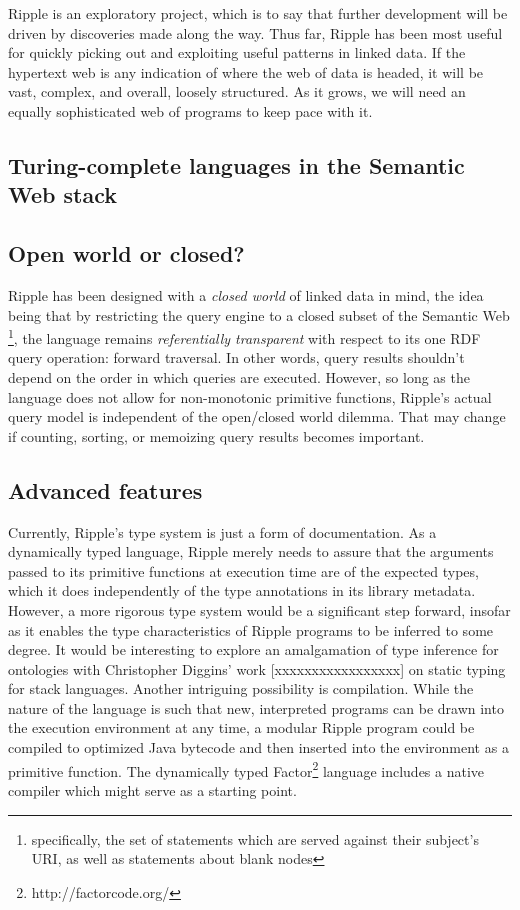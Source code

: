 \documentclass[runningheads]{llncs}
\begin{document}
Ripple is an exploratory project, which is to say that further development will be driven by discoveries made along the way.  Thus far, Ripple has been most useful for quickly picking out and exploiting useful patterns in linked data.  If the hypertext web is any indication of where the web of data is headed, it will be vast, complex, and overall, loosely structured.  As it grows, we will need an equally sophisticated web of programs to keep pace with it.

\subsection{Turing-complete languages in the Semantic Web stack}


\subsection{Open world or closed?}

Ripple has been designed with a \textit{closed world} of linked data in mind, the idea being that by restricting the query engine to a closed subset of the Semantic Web \footnote{specifically, the set of statements which are served against their subject's URI, as well as statements about blank nodes}, the language remains \textit{referentially transparent} with respect to its one RDF query operation: forward traversal.  In other words, query results shouldn't depend on the order in which queries are executed.  However, so long as the language does not allow for non-monotonic primitive functions, Ripple's actual query model is independent of the open/closed world dilemma.  That may change if counting, sorting, or memoizing query results becomes important.

\subsection{Advanced features}
Currently, Ripple's type system is just a form of documentation.  As a dynamically typed language, Ripple merely needs to assure that the arguments passed to its primitive functions at execution time are of the expected types, which it does independently of the type annotations in its library metadata.  However, a more rigorous type system would be a significant step forward, insofar as it enables the type characteristics of Ripple programs to be inferred to some degree.  It would be interesting to explore an amalgamation of type inference for ontologies with Christopher Diggins' work [xxxxxxxxxxxxxxxxx] on static typing for stack languages.
Another intriguing possibility is compilation.  While the nature of the language is such that new, interpreted programs can be drawn into the execution environment at any time, a modular Ripple program could be compiled to optimized Java bytecode and then inserted into the environment as a primitive function.  The dynamically typed Factor\footnote{http://factorcode.org/} language includes a native compiler which might serve as a starting point.
\end{document}
